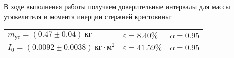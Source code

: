 В ходе выполнения работы получаем доверительные интервалы для массы утяжелителя и момента инерции стержней крестовины:

\begin{tabular}{lll}
    $m_{\text{ут}} = (0.47 \pm 0.04) \ \text{кг}$ & $\varepsilon = 8.40\%$ & $\alpha = 0.95$ \\

    $I_0 = (0.0092 \pm 0.0038) \ \text{кг} \cdot \text{м}^2$ & $\varepsilon = 41.59\%$ & $\alpha = 0.95$ \\
\end{tabular}